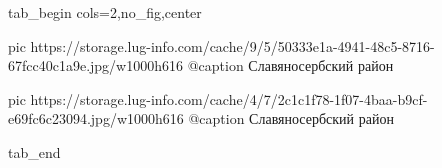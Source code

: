  
 
 
 
 



\ifcmt
  tab_begin cols=2,no_fig,center

     pic https://storage.lug-info.com/cache/9/5/50333e1a-4941-48c5-8716-67fcc40c1a9e.jpg/w1000h616
		 @caption Славяносербский район

		 pic https://storage.lug-info.com/cache/4/7/2c1c1f78-1f07-4baa-b9cf-e69fc6c23094.jpg/w1000h616
		 @caption Славяносербский район

  tab_end
\fi

